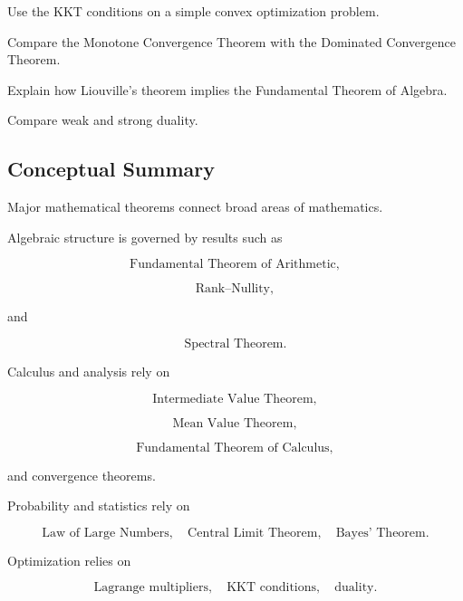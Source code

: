 \begin{exercise}[3]
Use the KKT conditions on a simple convex optimization problem.
\end{exercise}

\begin{exercise}[4]
Compare the Monotone Convergence Theorem with the Dominated Convergence
Theorem.
\end{exercise}

\begin{exercise}[4]
Explain how Liouville's theorem implies the Fundamental Theorem of Algebra.
\end{exercise}

\begin{exercise}[4]
Compare weak and strong duality.
\end{exercise}

\subsection{Conceptual Summary}
\label{subsec:common-theorems-summary}

Major mathematical theorems connect broad areas of mathematics.

Algebraic structure is governed by results such as

\[
\boxed{
\text{Fundamental Theorem of Arithmetic},
}
\]

\[
\boxed{
\text{Rank--Nullity},
}
\]

and

\[
\boxed{
\text{Spectral Theorem}.
}
\]

Calculus and analysis rely on

\[
\boxed{
\text{Intermediate Value Theorem},
}
\]

\[
\boxed{
\text{Mean Value Theorem},
}
\]

\[
\boxed{
\text{Fundamental Theorem of Calculus},
}
\]

and convergence theorems.

Probability and statistics rely on

\[
\boxed{
\text{Law of Large Numbers},
\quad
\text{Central Limit Theorem},
\quad
\text{Bayes' Theorem}.
}
\]

Optimization relies on

\[
\boxed{
\text{Lagrange multipliers},
\quad
\text{KKT conditions},
\quad
\text{duality}.
}
\]

